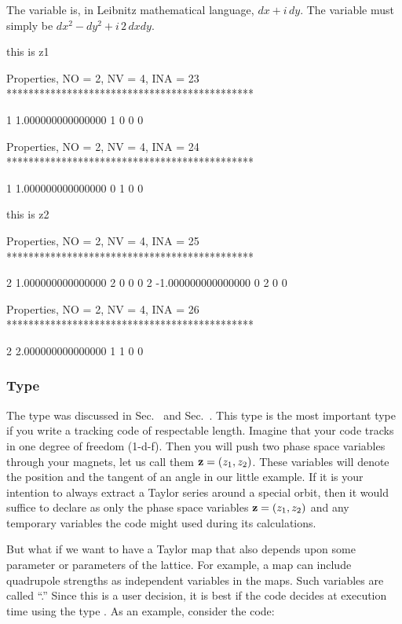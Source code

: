 \documentclass[english,12pt,article]{article} %
\begin{document}
The variable  is, in Leibnitz  mathematical  language, $dx+i \, dy$. The variable  must simply be $dx^2-dy^2+i\, 2\, dx dy$.
\begin{example1}
  this is z1

 Properties, NO =    2, NV =    4, INA =   23
 *********************************************

   1   1.000000000000000       1  0  0  0


 Properties, NO =    2, NV =    4, INA =   24
 *********************************************

   1   1.000000000000000       0  1  0  0

  this is z2

 Properties, NO =    2, NV =    4, INA =   25
 *********************************************

   2   1.000000000000000       2  0  0  0
   2  -1.000000000000000       0  2  0  0


 Properties, NO =    2, NV =    4, INA =   26
 *********************************************

   2   2.000000000000000       1  1  0  0
\end{example1}

\subsubsection{Type \protect{}}  \label{sec:real8code}

The  type was discussed in Sec.~ and Sec.~.
This type is the most important type if you write a tracking code of respectable length.  Imagine that your code tracks in one degree of freedom (1-d-f). Then you will push two phase space variables through your magnets, let us call them ${\bf z}=(z_1,z_2)$. These variables will denote  the position and the tangent of an angle in our little example.  If it is your  intention to always extract a Taylor series around a special orbit, then  it would suffice to declare as  only the phase space variables ${\bf z}=(z_1,z_2)$ and any temporary variables the code might used during its calculations. 

But what if we want to have a Taylor map that also depends upon some parameter or parameters of the lattice. For example, a map can include quadrupole strengths as independent variables in the maps. Such variables are called ``.'' Since this is a user decision, it is best if the code decides at execution time using the type .
As an example, consider the code:
\end{document}
